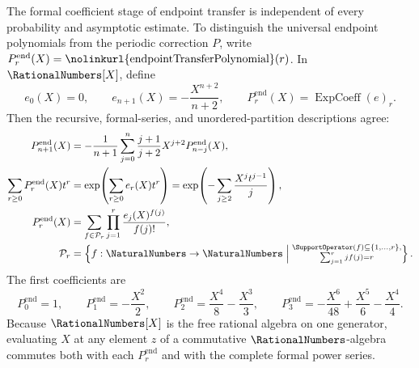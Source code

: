 \documentclass[11pt,oneside]{article}
\theoremstyle{definition}
\theoremstyle{remark}
\newcommand{\lean}[1]{%
  \ifmmode\text{\nolinkurl{#1}}\else\nolinkurl{#1}\fi}
\begin{document}
The formal coefficient stage of endpoint transfer is independent of every
probability and asymptotic estimate.  To distinguish the universal endpoint
polynomials from the periodic correction \(P\), write
\(P_r^{\mathrm{end}}(X)=\lean{endpointTransferPolynomial}(r)\).  In
\(\RationalNumbers[X]\), define
\begin{equation}
 e_0(X)=0,\qquad e_{n+1}(X)=-\frac{X^{n+2}}{n+2},\qquad
 P_r^{\mathrm{end}}(X)=\operatorname{ExpCoeff}(e)_r.        \label{eq:endpoint-transfer-coefficients}
\end{equation}
Then the recursive, formal-series, and unordered-partition descriptions agree:
\begin{align}
 P_{n+1}^{\mathrm{end}}(X)
   &=-\frac1{n+1}\sum_{j=0}^{n}\frac{j+1}{j+2}
       X^{j+2}P_{n-j}^{\mathrm{end}}(X),                    \label{eq:endpoint-transfer-recurrence}\\
 \sum_{r\ge0}P_r^{\mathrm{end}}(X)t^r
   &=\exp\!\left(\sum_{r\ge0}e_r(X)t^r\right)
    =\exp\!\left(-\sum_{j\ge2}\frac{X^jt^{j-1}}j\right), \label{eq:endpoint-transfer-formal-series}\\
 P_r^{\mathrm{end}}(X)
   &=\sum_{f\in\mathcal P_r}\prod_{j=1}^{r}
       \frac{e_j(X)^{f(j)}}{f(j)!},                        \notag\\
 \mathcal P_r
   &=\left\{f:\NaturalNumbers\to\NaturalNumbers\;\middle|\;
       \substack{\SupportOperator(f)\subseteq\{1,\ldots,r\},\\
                 \sum_{j=1}^{r}j f(j)=r}\right\}.         \label{eq:endpoint-transfer-partitions}
\end{align}
The first coefficients are
\begin{equation}
 P_0^{\mathrm{end}}=1,\qquad P_1^{\mathrm{end}}=-\frac{X^2}{2},\qquad
 P_2^{\mathrm{end}}=\frac{X^4}{8}-\frac{X^3}{3},\qquad
 P_3^{\mathrm{end}}=-\frac{X^6}{48}+\frac{X^5}{6}-\frac{X^4}{4}. \label{eq:endpoint-transfer-first-four}
\end{equation}
Because \(\RationalNumbers[X]\) is the free rational algebra on one generator, evaluating
\(X\) at any element \(z\) of a commutative \(\RationalNumbers\)-algebra commutes both with
each \(P_r^{\mathrm{end}}\) and with the complete formal power series.
\end{document}
